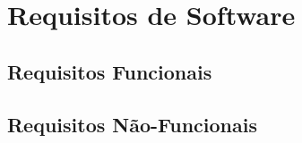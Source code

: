 \chapter{Requisitos de Software}

\section{Requisitos Funcionais}

\section{Requisitos Não-Funcionais}

